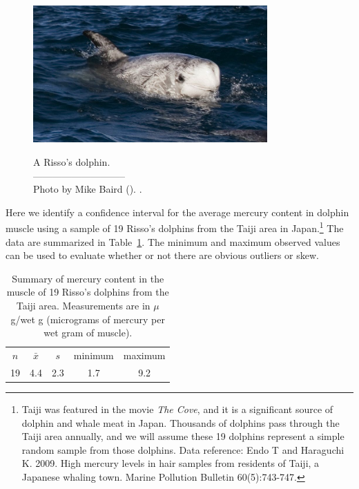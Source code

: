 \begin{figure}[h]
\centering
\includegraphics[width=0.8\textwidth]{ch_inference_for_means/figures/rissosDolphin/rissosDolphin.jpg}  \\
\addvspace{2mm}
\begin{minipage}{\textwidth}
   \caption[rissosDolphinPic]{A Risso's dolphin.\vspace{-1mm} \\
   -----------------------------\vspace{-2mm}\\
   {\footnotesize Photo by Mike Baird (). .}\vspace{-8mm}}
   \label{rissosDolphin}
\end{minipage}
\vspace{3mm}
\end{figure}
\setlength{\captionwidth}{\mycaptionwidth}

Here we identify a confidence interval for the average mercury content in dolphin muscle using a sample of 19 Risso's dolphins from the Taiji area in Japan.\footnote{Taiji was featured in the movie \emph{The Cove}, and it is a significant source of dolphin and whale meat in Japan. Thousands of dolphins pass through the Taiji area annually, and we will assume these 19 dolphins represent a simple random sample from those dolphins. Data reference: Endo T and Haraguchi K. 2009. High mercury levels in hair samples from residents of Taiji, a Japanese whaling town. Marine Pollution Bulletin 60(5):743-747.} The data are summarized in Table~\ref{summaryStatsOfHgInMuscleOfRissosDolphins}. The minimum and maximum observed values can be used to evaluate whether or not there are obvious outliers or skew.

\begin{table}[h]
\centering
\begin{tabular}{ccc cc}
\hline
$n$ & $\bar{x}$ & $s$ & minimum & maximum \\
19   & 4.4	  & 2.3  & 1.7	       & 9.2 \\
\hline
\end{tabular}
\caption{Summary of mercury content in the muscle of 19 Risso's dolphins from the Taiji area. Measurements are in $\mu$g/wet g (micrograms of mercury per wet gram of muscle).}
\label{summaryStatsOfHgInMuscleOfRissosDolphins}
\end{table}

